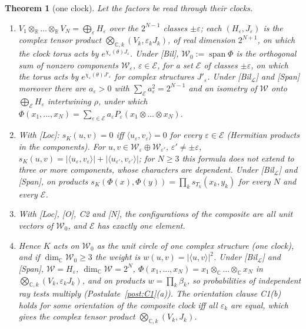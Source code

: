 \documentclass[aps,pra,onecolumn,superscriptaddress,nofootinbib,10pt]{revtex4-2}
\newtheorem{theorem}{Theorem}
\theoremstyle{definition}
\theoremstyle{remark}
\newcommand{\R}{\mathbb{R}}
\newcommand{\C}{\mathbb{C}}
\newcommand{\cL}{\mathcal{L}}
\newcommand{\ip}[2]{\langle #1,#2\rangle}
\begin{document}
\begin{theorem}[one clock]\label{thm:oneclock}
Let the factors be read through their clocks.
\begin{enumerate}[label=(\roman*),leftmargin=2em]
\item $V_1\otimes_\R\dots\otimes_\R V_N=\bigoplus_\varepsilon H_\varepsilon$ over the $2^{N-1}$ classes $\pm\varepsilon$; each $(H_\varepsilon,J_\varepsilon)$ is the
complex tensor product $\bigotimes_{\C,k}(V_k,\varepsilon_kJ_k)$, of real dimension $2^{N+1}$, on which the clock torus
acts by $e^{\chi_\varepsilon(\theta)J_\varepsilon}$.  Under [Bil], $\mathcal W_0:=\operatorname{span}\Phi$ is the orthogonal sum of nonzero
components $\mathcal W_\varepsilon$, $\varepsilon\in\mathcal E$, for a set $\mathcal E$ of classes $\pm\varepsilon$, on which the torus acts by
$e^{\chi_\varepsilon(\theta)J'_\varepsilon}$ for complex structures $J'_\varepsilon$.  Under [Bil$_\cL$] and [Span] moreover there are
$a_\varepsilon>0$ with $\sum_{\mathcal E}a_\varepsilon^2=2^{N-1}$ and an isometry of $\mathcal W$ onto $\bigoplus_{\mathcal E}H_\varepsilon$ intertwining $\rho$,
under which $\Phi(x_1,\dots,x_N)=\sum_{\varepsilon\in\mathcal E}a_\varepsilon P_\varepsilon(x_1\otimes\dots\otimes x_N)$.
\item With [Loc]: $s_K(u,v)=0$ iff $\ip{u_\varepsilon}{v_\varepsilon}=0$ for every $\varepsilon\in\mathcal E$ (Hermitian products in the
components).  For $u,v\in\mathcal W_\varepsilon\oplus\mathcal W_{\varepsilon'}$, $\varepsilon'\ne\pm\varepsilon$, $s_K(u,v)=\lvert\ip{u_\varepsilon}{v_\varepsilon}\rvert+\lvert\ip{u_{\varepsilon'}}{v_{\varepsilon'}}\rvert$; for
$N\ge3$ this formula does not extend to three or more components, whose characters are dependent.
Under [Bil$_\cL$] and [Span], on products $s_K(\Phi(x),\Phi(y))=\prod_ks_{T_k}(x_k,y_k)$ for every $N$ and every $\mathcal E$.
\item With [Loc], [O], C2 and [N], the configurations of the composite are all unit vectors of $\mathcal W_0$,
and $\mathcal E$ has exactly one element.
\item Hence $K$ acts on $\mathcal W_0$ as the unit circle of one complex structure (one clock), and if
$\dim_\C\mathcal W_0\ge3$ the weight is $w(u,v)=\lvert\ip uv\rvert^2$.  Under [Bil$_\cL$] and [Span], $\mathcal W=H_\varepsilon$,
$\dim_\C\mathcal W=2^N$, $\Phi(x_1,\dots,x_N)=x_1\otimes_\C\dots\otimes_\C x_N$ in $\bigotimes_{\C,k}(V_k,\varepsilon_kJ_k)$, and on products
$w=\prod_k\beta_k$, so probabilities of independent ray tests multiply (Postulate~\ref{post:C1}(a)).  The
orientation clause C1(b) holds for some orientation of the composite clock iff all $\varepsilon_k$ are equal,
which gives the complex tensor product $\bigotimes_{\C,k}(V_k,J_k)$.
\end{enumerate}
\end{theorem}
\end{document}

